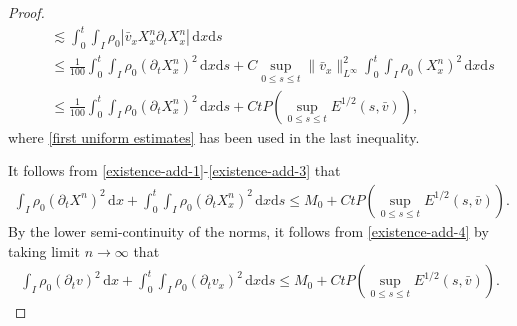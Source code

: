 \documentclass[11pt, reqno]{amsart}
\newcommand{\diff}{\mathrm{d}}
\numberwithin{equation}{section}
\begin{document}
{\begin{proof}
\begin{equation}
\begin{aligned}
&\quad\lesssim \int_0^t\int_I\rho_0|\bar{v}_xX^n_x\partial_tX^n_x|\,\diff x\diff s\\
&\quad\leq \frac{1}{100}\int_0^t\int_I\rho_0(\partial_tX^n_x)^2\,\diff x\diff s
+C\sup_{0\leq s\leq t}\|\bar{v}_x\|_{L^\infty}^2\int_0^t\int_I\rho_0(X^n_x)^2\,\diff x\diff s\\
&\quad\leq \frac{1}{100}\int_0^t\int_I\rho_0(\partial_tX^n_x)^2\,\diff x\diff s+Ct P(\sup_{0\leq s\leq t}E^{1/2}(s,\bar{v})),
\end{aligned}
\end{equation}
where \eqref{first uniform estimates} has been used in the last inequality.

It follows from \eqref{existence-add-1}-\eqref{existence-add-3} that
\begin{equation}\label{existence-add-4}
\begin{aligned}
\int_I \rho_0(\partial_tX^n)^2\,\diff x
+\int_0^t\int_I\rho_0(\partial_tX^n_x)^2\,\diff x\diff s
\leq M_0+Ct P(\sup_{0\leq s\leq t}E^{1/2}(s,\bar{v})).
\end{aligned}
\end{equation}
By the lower semi-continuity of the norms, it follows from \eqref{existence-add-4} by taking limit \(n\to\infty\) that 
\begin{equation}\label{existence-add-5}
\begin{aligned}
\int_I \rho_0(\partial_tv)^2\,\diff x
+\int_0^t\int_I\rho_0(\partial_tv_x)^2\,\diff x\diff s
\leq M_0+Ct P(\sup_{0\leq s\leq t}E^{1/2}(s,\bar{v})).
\end{aligned}
\end{equation}


\end{proof}}
\end{document}
